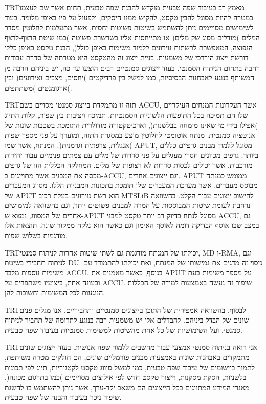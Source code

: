\documentclass[12pt,a4paper,table]{report}
\newcommand{\heb}[1]{\bgroup\textdir TRT\hebfont #1\egroup}
\begin{document}
\begin{flushright}
\heb{מאמץ רב בעיבוד שפה טבעית מוקדש להבנת שפה טבעית, תחום אשר שם לעצמו כמטרה להיות מסוגל להבין טקסט,
להקיש ממנו היסקים, ולפעול על פיו באופן מלומד. בעוד לשימושים מסויימים ניתן להשתמש בשיטות פשוטות יחסית,
אשר מתעלמות לחלוטין מסדר המלים )מודלים מסוג שק מלים( או מתייחסות אליו כשרשרת פשוטה
)כמו שיטת הרצף-לרצף הנפוצה, המאפשרת לרשתות נוירונים ללמוד משימות באופן כולל(, הבנת טקסט באופן כללי דורשת
ייצוג היררכי של משמעות. בניית ייצוג זה מהטקסט היא מטרתה של סדרת עבודות רחבה בתחום הניתוח הסמנטי.
בעוד ייצוגים סמנטיים רבים הוצעו עד כה, יש ביניהם הרבה מן המשותף בנוגע לאבחנות הבסיסיות, כמו למשל בין
פרדיקטים )יחסים, מצבים ואירועים( ובין ארגומנטים )משתתפים(.}

\heb{תזה זו מתמקדת בייצוג סמנטי מסויים בשם ACCU, אשר העקרונות המנחים העיקריים שלו הם
תמיכה בכל התופעות הלשוניות הסמנטיות, תמיכה ויציבות בין שפות, קלות התיוג )אפילו בידי מי שאינו מומחה בבלשנות(,
וארכיטקטורה מודולרית התומכת בשכבות שונות של אנוטציה סמנטית.
מנתח אוטומטי לחלוטין מוצע במסגרת התזה, ומוערך על פני מספר שפות )אנגלית, צרפתית וגרמנית(.
המנתח, אשר שמו APUT, מסוגל ללמוד מבנים גרפיים כללים ביותר: גרפים מכוונים חסרי מעגלים על-פני
סדרות של מלים עם צמתים פנימיים עבור יחידות מורכבות, אשר יכולים לכסות סדרות לא רצופות של מלים.
המחלקה הכללית הזו של גרפים מכסה את המבנים אשר מתוייגים ב-ACCU, וגם ייצוגים אחרים.
APUT ממומש כמנתח מבוסס מעברים, אשר מערכת המעברים שלו תומכת בתכונות המבניות הללו.
מסווג המעברים של APUT הוא רשת נוירונים בעלת רכיב MTSLiB לחישוב ייצוגים עבור הקלט.
בהשוואה נרחבת לעומת שיטות המבוססות על המרה למבנים פשוטים יותר, וגם בהשוואה למימושים אחרים של המסווג,
נמצא ש-APUT מסוגל לנתח בדיוק רב יותר טקסט למבני ACCU, גם במצב שבו אוסף הבדיקה דומה לאוסף האימון
וגם כאשר הוא נלקח ממקור שונה. תוצאות אלו מודגמות בשלוש שפות.}

\heb{יכולתו של המנתח מודגמת גם לשתי שיטות אחרות לניתוח סמנטי, MD ו-RMA,
וגם לניתוח תחבירי בשיטת DU. ניסוי זה מדגים את גמישותו של המנתח, ואת יכולתו להתמודד
עם משימות נוספות מלבד ACCU. בנוסף, כאשר מאמנים את APUT על מספר משימות בעת ובעונה אחת,
ביצועיו משתפרים על ACCU. שיפור זה נעשה באמצעות למידה של הכללות הנוגעות לכל המשימות וחשובות להן.}

\heb{לבסוף, בהשוואה אמפירית של התוכן בייצוגים סמנטיים ותחביריים, אנו מגלים פנים שונים של הבדל ביניהם.
להבדלים אלו יש משמעות רבה בנוגע לתרומה של תחביר לניתוח סמנטי, ועל השימושיות של כל אחת מהשיטות למשימות
סמנטיות בעיבוד שפה טבעית.}

\heb{אני רואה בניתוח סמנטי אמצעי עבור מחשבים ללמוד שפה אנושית.
בעוד ייצוגים שונים מתמקדים באבחנות שונות באמצעות מבנים פורמליים שונים,
הם חולקים מטרה משותפת, לתמוך ביישומים של עיבוד שפה טבעית, כמו למשל
סיווג טקסט לקטגוריות, תיוג לפי תכונות בלשניות,
הסקת מסקנות,
וייצור טקסט חדש לפי אילוצים מסויימים )כמו בתרגום מכונה(.
מאגרי המידע המתויגים בכל הייצוגים הם משאב יקר-ערך,
אשר ניתן להשתמש בו להשגת שיפור ניכר בעיבוד והבנה של שפה טבעית.}
\end{flushright}
\end{document}

